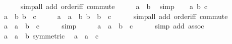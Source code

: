 \begin{isabellebody}
\ \ \ \ \isamarkupfalse%
\ {\isacharparenleft}{\kern0pt}simp{\isacharunderscore}{\kern0pt}all\ add{\isacharcolon}{\kern0pt}\ order{\isacharunderscore}{\kern0pt}iff\ commute{\isacharparenright}{\kern0pt}\isanewline
\ \ \isamarkupfalse%
\ \isamarkupfalse%
\ {\isachardoublequoteopen}a\ {\isacharequal}{\kern0pt}\ b{\isachardoublequoteclose}\ \isamarkupfalse%
\ simp\isanewline
{}\isamarkupfalse%
\isanewline
\ \ \isamarkupfalse%
\ a\ b\ c\isanewline
\ \ \isamarkupfalse%
\ {\isachardoublequoteopen}a\ \isactrlbold {\isasymle}\ b{\isachardoublequoteclose}\ {\isachardoublequoteopen}b\ \isactrlbold {\isasymle}\ c{\isachardoublequoteclose}\isanewline
\ \ \isamarkupfalse%
\ \isamarkupfalse%
\ {\isachardoublequoteopen}a\ {\isacharequal}{\kern0pt}\ a\ \isactrlbold {\isacharasterisk}{\kern0pt}\ b{\isachardoublequoteclose}\ {\isachardoublequoteopen}b\ {\isacharequal}{\kern0pt}\ b\ \isactrlbold {\isacharasterisk}{\kern0pt}\ c{\isachardoublequoteclose}\isanewline
\ \ \ \ \isamarkupfalse%
\ {\isacharparenleft}{\kern0pt}simp{\isacharunderscore}{\kern0pt}all\ add{\isacharcolon}{\kern0pt}\ order{\isacharunderscore}{\kern0pt}iff\ commute{\isacharparenright}{\kern0pt}\isanewline
\ \ \isamarkupfalse%
\ \isamarkupfalse%
\ {\isachardoublequoteopen}a\ {\isacharequal}{\kern0pt}\ a\ \isactrlbold {\isacharasterisk}{\kern0pt}\ {\isacharparenleft}{\kern0pt}b\ \isactrlbold {\isacharasterisk}{\kern0pt}\ c{\isacharparenright}{\kern0pt}{\isachardoublequoteclose}\isanewline
\ \ \ \ \isamarkupfalse%
\ simp\isanewline
\ \ \isamarkupfalse%
\ \isamarkupfalse%
\ {\isachardoublequoteopen}a\ {\isacharequal}{\kern0pt}\ {\isacharparenleft}{\kern0pt}a\ \isactrlbold {\isacharasterisk}{\kern0pt}\ b{\isacharparenright}{\kern0pt}\ \isactrlbold {\isacharasterisk}{\kern0pt}\ c{\isachardoublequoteclose}\isanewline
\ \ \ \ \isamarkupfalse%
\ {\isacharparenleft}{\kern0pt}simp\ add{\isacharcolon}{\kern0pt}\ assoc{\isacharparenright}{\kern0pt}\isanewline
\ \ \isamarkupfalse%
\ {\isacartoucheopen}a\ {\isacharequal}{\kern0pt}\ a\ \isactrlbold {\isacharasterisk}{\kern0pt}\ b{\isacartoucheclose}\ {\isacharbrackleft}{\kern0pt}symmetric{\isacharbrackright}{\kern0pt}\ \isamarkupfalse%
\ {\isachardoublequoteopen}a\ {\isacharequal}{\kern0pt}\ a\ \isactrlbold {\isacharasterisk}{\kern0pt}\ c{\isachardoublequoteclose}\ \isamarkupfalse%

\end{isabellebody}
